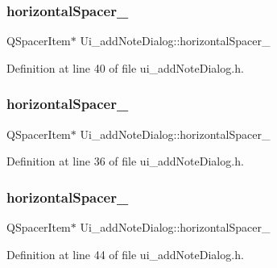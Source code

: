 \subsubsection{\texorpdfstring{horizontal\+Spacer\+\_}{horizontalSpacer\_2}}
{\footnotesize\ttfamily Q\+Spacer\+Item$\ast$ Ui\+\_\+add\+Note\+Dialog\+::horizontal\+Spacer\+\_}



Definition at line 40 of file ui\+\_\+add\+Note\+Dialog.\+h.

\hypertarget{classUi__addNoteDialog_a790839063730f8529b1ee5c38bcea903}{}\label{classUi__addNoteDialog_a790839063730f8529b1ee5c38bcea903} 
\subsubsection{\texorpdfstring{horizontal\+Spacer\+\_}{horizontalSpacer\_5}}
{\footnotesize\ttfamily Q\+Spacer\+Item$\ast$ Ui\+\_\+add\+Note\+Dialog\+::horizontal\+Spacer\+\_}



Definition at line 36 of file ui\+\_\+add\+Note\+Dialog.\+h.

\hypertarget{classUi__addNoteDialog_a2e0afdb4de479696f7488193836420bd}{}\label{classUi__addNoteDialog_a2e0afdb4de479696f7488193836420bd} 
\subsubsection{\texorpdfstring{horizontal\+Spacer\+\_}{horizontalSpacer\_6}}
{\footnotesize\ttfamily Q\+Spacer\+Item$\ast$ Ui\+\_\+add\+Note\+Dialog\+::horizontal\+Spacer\+\_}



Definition at line 44 of file ui\+\_\+add\+Note\+Dialog.\+h.

\hypertarget{classUi__addNoteDialog_a2f452da1121f801c554ea1d45b776c6b}{}\label{classUi__addNoteDialog_a2f452da1121f801c554ea1d45b776c6b} 
